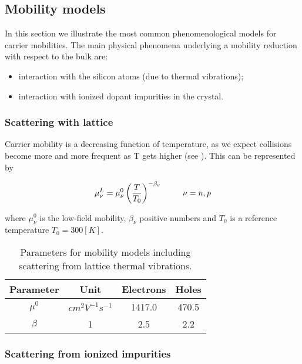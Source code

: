 \subsection{Mobility models}

In this section we illustrate the most common phenomenological models for carrier mobilities. The main physical phenomena underlying a mobility reduction with respect to the bulk are:

\begin{itemize}
\item interaction with the silicon atoms (due to thermal vibrations);
\item interaction with ionized dopant impurities in the crystal.
\end{itemize}

\subsubsection{Scattering with lattice}

Carrier mobility is a decreasing function of temperature, as we expect collisions become more and more frequent as T gets higher (see \cite{Lombardi:MobConst}). This can be represented by

\begin{equation}
\label{eq: mobility thermal}
\mu_\nu^L = \mu_\nu^0\left( \dfrac{T}{T_0}\right)^{-\beta_\nu} \psp{15} \nu = n,p
\end{equation}

where $\mu_\nu^0$ is the low-field mobility, $\beta_\nu$ positive numbers and $T_0$ is a reference temperature $T_0=300[K]$.

\begin{table}[!h]
\centering
\begin{tabular}{cccc}
\toprule
Parameter & Unit & Electrons & Holes \\
\midrule
$\mu^0$ & $cm^2V^{-1}s^{-1}$ & 1417.0 & 470.5\\
$\beta$ & 1 & 2.5 & 2.2\\
\bottomrule
\end{tabular}
\caption{Parameters for mobility models including scattering from lattice thermal vibrations.}
\end{table}

\subsubsection{Scattering from ionized impurities}
\label{sec: Masetti model}

